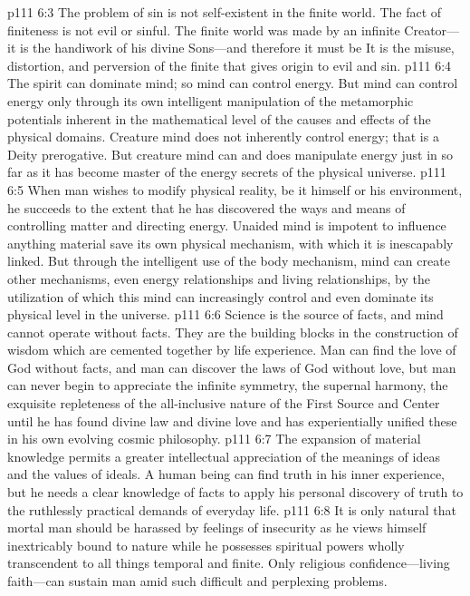 \pc \vs p111 6:3 The problem of sin is not self\hyp{}existent in the finite world. The fact of finiteness is not evil or sinful. The finite world was made by an infinite Creator---it is the handiwork of his divine Sons---and therefore it must be  It is the misuse, distortion, and perversion of the finite that gives origin to evil and sin.
\pc \vs p111 6:4 The spirit can dominate mind; so mind can control energy. But mind can control energy only through its own intelligent manipulation of the metamorphic potentials inherent in the mathematical level of the causes and effects of the physical domains. Creature mind does not inherently control energy; that is a Deity prerogative. But creature mind can and does manipulate energy just in so far as it has become master of the energy secrets of the physical universe.
\vs p111 6:5 When man wishes to modify physical reality, be it himself or his environment, he succeeds to the extent that he has discovered the ways and means of controlling matter and directing energy. Unaided mind is impotent to influence anything material save its own physical mechanism, with which it is inescapably linked. But through the intelligent use of the body mechanism, mind can create other mechanisms, even energy relationships and living relationships, by the utilization of which this mind can increasingly control and even dominate its physical level in the universe.
\vs p111 6:6 Science is the source of facts, and mind cannot operate without facts. They are the building blocks in the construction of wisdom which are cemented together by life experience. Man can find the love of God without facts, and man can discover the laws of God without love, but man can never begin to appreciate the infinite symmetry, the supernal harmony, the exquisite repleteness of the all\hyp{}inclusive nature of the First Source and Center until he has found divine law and divine love and has experientially unified these in his own evolving cosmic philosophy.
\vs p111 6:7 The expansion of material knowledge permits a greater intellectual appreciation of the meanings of ideas and the values of ideals. A human being can find truth in his inner experience, but he needs a clear knowledge of facts to apply his personal discovery of truth to the ruthlessly practical demands of everyday life.
\pc \vs p111 6:8 It is only natural that mortal man should be harassed by feelings of insecurity as he views himself inextricably bound to nature while he possesses spiritual powers wholly transcendent to all things temporal and finite. Only religious confidence---living faith---can sustain man amid such difficult and perplexing problems.

